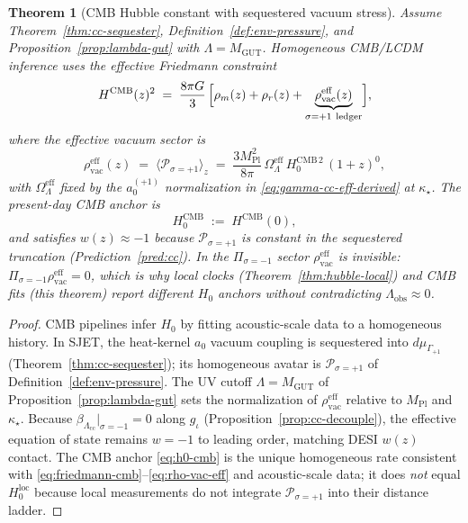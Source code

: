 \documentclass[aps,prd,onecolumn,amsmath,amssymb,nofootinbib,11pt]{revtex4-2}
\numberwithin{equation}{section}
\theoremstyle{plain}
\newtheorem{theorem}{Theorem}[section]
\theoremstyle{definition}
\theoremstyle{remark}
\newcommand{\MPl}{M_{\mathrm{Pl}}}
\begin{document}
\begin{theorem}[CMB Hubble constant with sequestered vacuum stress]
\label{thm:hubble-cmb}
Assume Theorem~\ref{thm:cc-sequester}, Definition~\ref{def:env-pressure},
and Proposition~\ref{prop:lambda-gut} with $\Lambda=M_{\mathrm{GUT}}$.
Homogeneous CMB/LCDM inference uses the effective Friedmann constraint
\begin{equation}\label{eq:friedmann-cmb}
  H^{\mathrm{CMB}}(z)^2
  \;=\;
  \frac{8\pi G}{3}\,
  \Bigl[
    \rho_m(z)+\rho_r(z)
    +\underbrace{\rho_{\mathrm{vac}}^{\mathrm{eff}}(z)}_{\sigma=+1\ \text{ledger}}
  \Bigr],
\end{equation}
where the effective vacuum sector is
\begin{equation}\label{eq:rho-vac-eff}
  \rho_{\mathrm{vac}}^{\mathrm{eff}}(z)
  \;=\;
  \langle\mathcal{P}_{\sigma=+1}\rangle_z
  \;=\;
  \frac{3\MPl^2}{8\pi}\,
  \Omega_\Lambda^{\mathrm{eff}}\,H_0^{\mathrm{CMB}\,2}\,(1+z)^0,
\end{equation}
with $\Omega_\Lambda^{\mathrm{eff}}$ fixed by the $a_0^{(+1)}$ normalization
in \eqref{eq:gamma-cc-eff-derived} at $\kappa_\star$. The present-day CMB
anchor is
\begin{equation}\label{eq:h0-cmb}
  H_0^{\mathrm{CMB}}
  \;:=\;
  H^{\mathrm{CMB}}(0),
\end{equation}
and satisfies $w(z)\approx -1$ because $\mathcal{P}_{\sigma=+1}$ is constant
in the sequestered truncation (Prediction~\ref{pred:cc}). In the
$\Pi_{\sigma=-1}$ sector $\rho_{\mathrm{vac}}^{\mathrm{eff}}$ is invisible:
$\Pi_{\sigma=-1}\rho_{\mathrm{vac}}^{\mathrm{eff}}=0$, which is why local
clocks (Theorem~\ref{thm:hubble-local}) and CMB fits (this theorem) report
different $H_0$ anchors without contradicting $\Lambda_{\mathrm{obs}}\approx 0$.
\end{theorem}

\begin{proof}
CMB pipelines infer $H_0$ by fitting acoustic-scale data to a homogeneous
history. In SJET, the heat-kernel $a_0$ vacuum coupling is sequestered into
$d\mu_{\Gamma_{+1}}$ (Theorem~\ref{thm:cc-sequester}); its homogeneous avatar
is $\mathcal{P}_{\sigma=+1}$ of Definition~\ref{def:env-pressure}. The UV
cutoff $\Lambda=M_{\mathrm{GUT}}$ of Proposition~\ref{prop:lambda-gut} sets
the normalization of $\rho_{\mathrm{vac}}^{\mathrm{eff}}$ relative to
$\MPl$ and $\kappa_\star$. Because
$\beta_{\Lambda_{\mathrm{cc}}}|_{\sigma=-1}=0$ along $g_\iota$
(Proposition~\ref{prop:cc-decouple}), the effective equation of state
remains $w=-1$ to leading order, matching DESI $w(z)$ contact. The CMB anchor
\eqref{eq:h0-cmb} is the unique homogeneous rate consistent with
\eqref{eq:friedmann-cmb}--\eqref{eq:rho-vac-eff} and acoustic-scale data;
it does \emph{not} equal $H_0^{\mathrm{loc}}$ because local measurements do
not integrate $\mathcal{P}_{\sigma=+1}$ into their distance ladder.
\end{proof}
\end{document}
